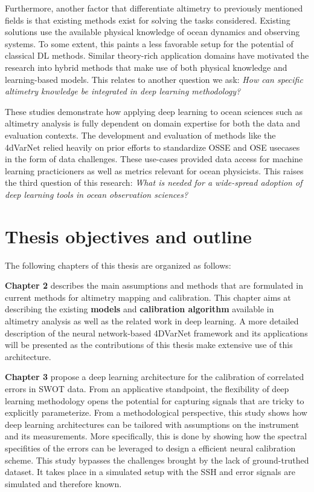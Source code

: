 \begin{bibunit}
Furthermore, another factor that differentiate altimetry to previously mentioned fields is that existing methods exist for solving the tasks considered. Existing solutions use the available physical knowledge of ocean dynamics and observing systems. To some extent, this paints a less favorable setup for the potential of classical DL methods. Similar theory-rich application domains have motivated the research into hybrid methods that make use of both physical knowledge and learning-based models.
This relates to another question we ask: \textit{How can specific altimetry knowledge be integrated in deep learning methodology?}


These studies demonstrate how applying deep learning to ocean sciences such as altimetry analysis is fully dependent on domain expertise for both the data and evaluation contexts.
The development and evaluation of methods like the 4dVarNet relied heavily on prior efforts to standardize OSSE and OSE usecases in the form of data challenges\cite{ballarottaOceandatachallenges2020a_SSH_mapping_NATL60Material2020,ballarottaOceandatachallenges2021a_SSH_mapping_OSEMaterial2021}. These use-cases provided data access for machine learning practicioners as well as metrics relevant for ocean physicists. 
This raises the third question of this research: \textit{What is needed for a wide-spread adoption of deep learning tools in ocean observation sciences?}




\section{Thesis objectives and outline}

The following chapters of this thesis are organized as follows:

\textbf{Chapter 2} describes the main assumptions and methods that are formulated in current methods for altimetry mapping and calibration. This chapter aims at describing the existing \textbf{models} and \textbf{calibration algorithm} available in altimetry analysis as well as the related work in deep learning. A more detailed description of the neural network-based 4DVarNet framework and its applications will be presented as the contributions of this thesis make extensive use of this architecture.

\textbf{Chapter 3} propose a deep learning architecture for the calibration of correlated errors in SWOT data.
From an applicative standpoint, the flexibility of deep learning methodology opens the potential for capturing signals that are tricky to explicitly parameterize.
From a methodological perspective, this study shows how deep learning architectures can be tailored with assumptions on the instrument and its measurements.
More specifically, this is done by showing how the spectral specifities of the errors can be leveraged to design a efficient neural calibration scheme.
This study bypasses the challenges brought by the lack of ground-truthed dataset.
It takes place in a simulated setup with the SSH and error signals are simulated and therefore known.



\end{bibunit}
